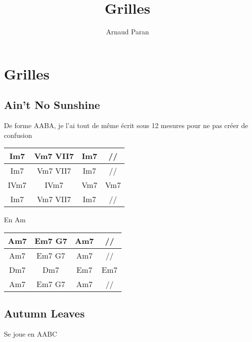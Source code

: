 \documentclass[a4paper,10pt]{article}
\title{Grilles}
\author{Arnaud Paran}
\begin{document}
\maketitle
\newpage
\tableofcontents
\newpage
{}


\section{Grilles}
\LARGE

\subsection{Ain't No Sunshine}
\normalsize
De forme AABA, je l'ai tout de même écrit sous 12 mesures pour ne pas créer de confusion
\LARGE

\begin{tabular}{ | c | c | c | c | } \hline			
	Im7 & Vm7 VII7 & Im7 & // \\ \hline  
	Im7 & Vm7 VII7 & Im7 & // \\ \hline  
	IVm7 & IVm7 & Vm7 & Vm7 \\ \hline  
	Im7 & Vm7 VII7 & Im7 & // \\ \hline  
\end{tabular}
\newline
\newline

En Am

\begin{tabular}{ | c | c | c | c | } \hline			
	Am7 & Em7 G7 & Am7 & // \\ \hline  
	Am7 & Em7 G7 & Am7 & // \\ \hline  
	Dm7 & Dm7 & Em7 & Em7 \\ \hline  
	Am7 & Em7 G7 & Am7 & // \\ \hline  
\end{tabular}
\newpage

\subsection{Autumn Leaves}
Se joue en AABC
\newline
\end{document}
